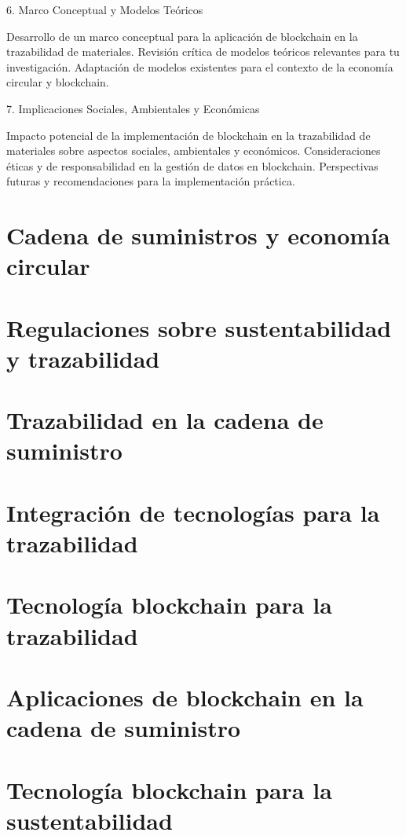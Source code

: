 \documentclass[main.tex]{subfiles}
\begin{document}
6. Marco Conceptual y Modelos Teóricos

    Desarrollo de un marco conceptual para la aplicación de blockchain en la trazabilidad de materiales.
    Revisión crítica de modelos teóricos relevantes para tu investigación.
    Adaptación de modelos existentes para el contexto de la economía circular y blockchain.

7. Implicaciones Sociales, Ambientales y Económicas

    Impacto potencial de la implementación de blockchain en la trazabilidad de materiales sobre aspectos sociales, ambientales y económicos.
    Consideraciones éticas y de responsabilidad en la gestión de datos en blockchain.
    Perspectivas futuras y recomendaciones para la implementación práctica.

\section{Cadena de suministros y economía circular}

\section{Regulaciones sobre sustentabilidad y trazabilidad}

\section{Trazabilidad en la cadena de suministro}

\section{Integración de tecnologías para la trazabilidad}

\section{Tecnología blockchain para la trazabilidad}

\section{Aplicaciones de blockchain en la cadena de suministro}

\section{Tecnología blockchain para la sustentabilidad}
\end{document}
